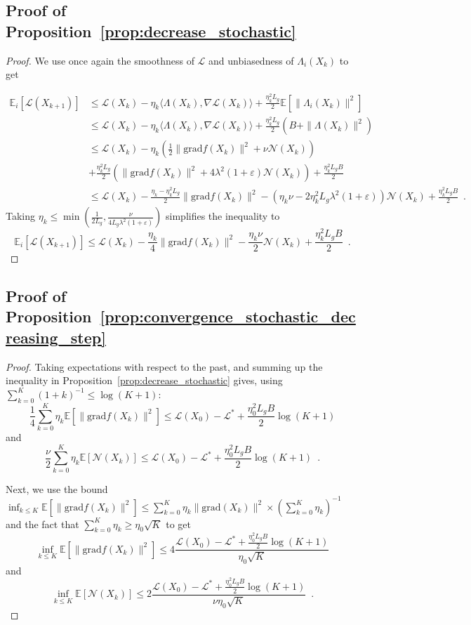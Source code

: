 \documentclass[twoside,11pt]{article}
\newcommand{\grad}{{\mathrm{grad}}}
\begin{document}
\subsection{Proof of Proposition~\ref{prop:decrease_stochastic}}
\begin{proof}We use once again the smoothness of $\mathcal{L}$ and unbiasedness of $\Lambda_i(X_k)$ to get

\begin{align}
    \mathbb{E}_i[\mathcal{L}(X_{k+1})]&\leq\mathcal{L}(X_k) - \eta_k\langle \Lambda(X_k), \nabla\mathcal{L}(X_k)\rangle+\frac{\eta_k^2L_g}2\mathbb{E}[\|\Lambda_i(X_k)\|^2]\\
    &\leq \mathcal{L}(X_k) - \eta_k\langle \Lambda(X_k), \nabla\mathcal{L}(X_k)\rangle+\frac{\eta_k^2L_g}2(B + \|\Lambda(X_k)\|^2) \\
    &\leq \mathcal{L}(X_k) - \eta_k(\frac12\|\grad f(X_k)\|^2 + \nu \mathcal{N}(X_k))\\
    &+ \frac{\eta_k^2L_g}2(\|\grad f(X_k)\|^2 + 4\lambda^2(1+\varepsilon)\mathcal{N}(X_k))+ \frac{\eta_k^2L_gB}2 \\
    &\leq  \mathcal{L}(X_k) - \frac{\eta_k - \eta_k^2L_g}2\|\grad f(X_k)\|^2 - (\eta_k\nu - 2\eta_k^2L_g\lambda^2(1+\varepsilon))\mathcal{N}(X_k )+\frac{\eta_k^2L_gB}2\enspace.
\end{align}
Taking $\eta_k\leq \min(\frac1{2L_g}, \frac{\nu}{4L_g\lambda^2(1+\varepsilon)})$ simplifies the inequality to 
$$
\mathbb{E}_i[\mathcal{L}(X_{k+1})]\leq \mathcal{L}(X_k) - \frac{\eta_k}4 \|\grad f(X_k)\|^2 - \frac{\eta_k\nu}2\mathcal{N}(X_k)+\frac{\eta_k^2L_gB}2\enspace.
$$
\end{proof}
\subsection{Proof of Proposition~\ref{prop:convergence_stochastic_decreasing_step}}
\begin{proof}
Taking expectations with respect to the past, and summing up the inequality in Proposition~\ref{prop:decrease_stochastic} gives, using $\sum_{k=0}^K (1 + k)^{-1}\leq \log(K +1)$:
$$
\frac14\sum_{k=0}^K\eta_k\mathbb{E}[\|\grad f(X_k)\|^2] \leq \mathcal{L}(X_0) - \mathcal{L}^* + \frac{\eta_0^2L_g B}2 \log(K+1)
$$
and 
$$
\frac\nu2\sum_{k=0}^K\eta_k\mathbb{E}[\mathcal{N}(X_k)] \leq \mathcal{L}(X_0) - \mathcal{L}^* + \frac{\eta_0^2L_g B}2 \log(K+1)\enspace.
$$

Next, we use the bound $\inf_{k\leq K}\mathbb{E}[\|\grad f(X_k)\|^2]\leq \sum_{k=0}^K\eta_k\|\grad(X_k)\|^2 \times (\sum_{k=0}^K\eta_k)^{-1}$ and the fact that $\sum_{k=0}^K\eta_k\geq \eta_0\sqrt{K}$
%
to get
$$
\inf_{k\leq K}\mathbb{E}[\|\grad f(X_k)\|^2] \leq 4\frac{ \mathcal{L}(X_0) - \mathcal{L}^* + \frac{\eta_0^2L_g B}2 \log(K+1)}{\eta_0\sqrt{K}}
$$
and 
$$
\inf_{k\leq K}\mathbb{E}[\mathcal{N}(X_k)] \leq 2\frac{ \mathcal{L}(X_0) - \mathcal{L}^* + \frac{\eta_0^2L_g B}2 \log(K+1)}{\nu\eta_0\sqrt{K}} \enspace.
$$
\end{proof}
\end{document}
